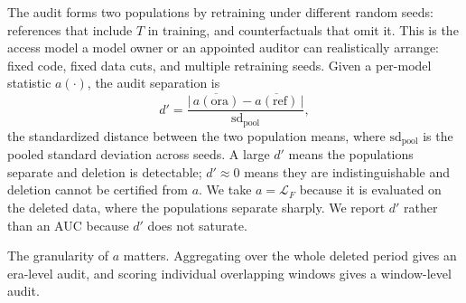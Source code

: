 The audit forms two populations by retraining under different random
seeds: references that include $T$ in training, and counterfactuals
that omit it. This is the access model a model owner or an appointed
auditor can realistically arrange: fixed code, fixed data cuts, and
multiple retraining seeds. Given a per-model statistic $a(\cdot)$,
the audit separation is
\begin{equation}
d' = \frac{\bigl\lvert\, \overline{a(\text{ora})} -
\overline{a(\text{ref})} \,\bigr\rvert}{\mathrm{sd}_{\text{pool}}},
\label{eq:dprime}
\end{equation}
the standardized distance between the two population means, where
$\mathrm{sd}_{\text{pool}}$ is the pooled standard deviation across
seeds. A large $d'$ means the populations separate and deletion is
detectable; $d' \approx 0$ means they are indistinguishable and
deletion cannot be certified from $a$. We take $a = \mathcal{L}_F$
because it is evaluated on the deleted data, where the populations
separate sharply. We report $d'$ rather than an AUC because $d'$
does not saturate.

The granularity of $a$ matters. Aggregating over the whole deleted
period gives an era-level audit, and scoring individual overlapping
windows gives a window-level audit.
